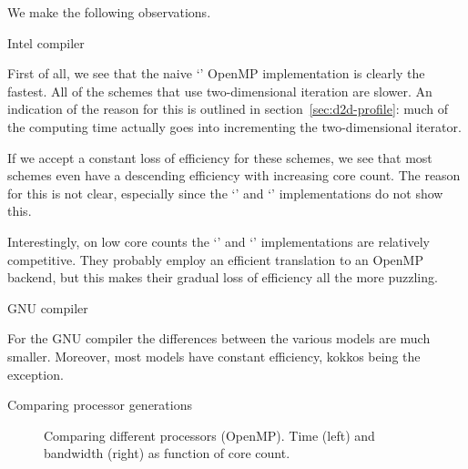 We make the following observations.

 {Intel compiler}

First of all, we see that the naive `' OpenMP implementation
is clearly the fastest.
All of the schemes that use two-dimensional iteration are slower.
An indication of the reason for this is outlined in section~\ref{sec:d2d-profile}:
much of the computing time actually goes into incrementing the
two-dimensional iterator.

If we accept a constant loss of efficiency for these schemes,
we see that most schemes even have a descending efficiency
with increasing core count.
The reason for this is not clear, especially since the
`' and `' implementations do not show this.

Interestingly, on low core counts the `' and `'
implementations are relatively competitive.
They probably employ an efficient translation to an OpenMP backend,
but this makes their gradual loss of efficiency all the more puzzling.

 {GNU compiler}

For the GNU compiler the differences between the various models
are much smaller.
Moreover, most models have constant efficiency, kokkos being the exception.

 {Comparing processor generations}

\begin{figure*}[t]
  \hbox\bgroup %
  
  
  \egroup %
  \caption{Comparing different processors (OpenMP). Time (left)
    and bandwidth (right) as function of core count.}
  \label{fig:diff2d-procs}
\end{figure*}

